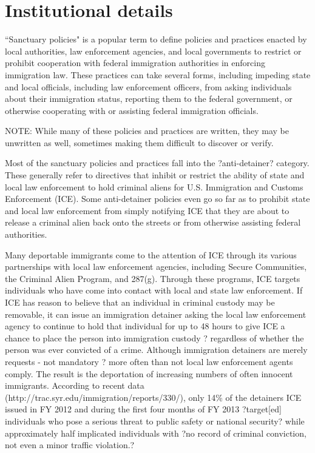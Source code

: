 \section{Institutional details}
``Sanctuary policies" is a popular term to define policies and practices enacted by local authorities, law enforcement agencies, and local governments to restrict or prohibit cooperation with federal immigration authorities in enforcing immigration law. These practices can take several forms, including impeding state and local officials, including law enforcement officers, from asking individuals about their immigration status, reporting them to the federal government, or otherwise cooperating with or assisting federal immigration officials. 

NOTE: While many of these policies and practices are written, they may be unwritten as well, sometimes making them difficult to discover or verify.

Most of the sanctuary policies and practices fall into the ?anti-detainer? category. These generally refer to directives that inhibit or restrict the ability of state and local law enforcement to hold criminal aliens for U.S. Immigration and Customs Enforcement (ICE). Some anti-detainer policies even go so far as to prohibit state and local law enforcement from simply notifying ICE that they are about to release a criminal alien back onto the streets or from otherwise assisting federal authorities.

Many deportable immigrants come to the attention of ICE through its various partnerships with local law enforcement agencies, including Secure Communities, the Criminal Alien Program, and 287(g). Through these programs, ICE targets individuals who have come into contact with local and state law enforcement. If ICE has reason to believe that an individual in criminal custody may be removable, it can issue an immigration detainer asking the local law enforcement agency to continue to hold that individual for up to 48 hours to give ICE a chance to place the person into immigration custody ? regardless of whether the person was ever convicted of a crime. Although immigration detainers are merely requests - not mandatory ? more often than not local law enforcement agents comply. The result is the deportation of increasing numbers of often innocent immigrants. According to recent data (http://trac.syr.edu/immigration/reports/330/), only 14\% of the detainers ICE issued in FY 2012 and during the first four months of FY 2013 ?target[ed] individuals who pose a serious threat to public safety or national security? while approximately half implicated individuals with ?no record of criminal conviction, not even a minor traffic violation.?

